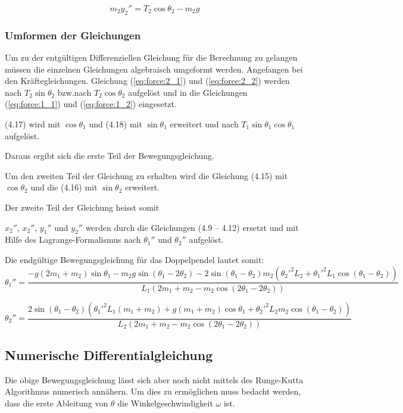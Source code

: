 \documentclass[12pt]{article}
\numberwithin{equation}{subsection}
\begin{document}
\begin{equation} \label{eq:force:2_2}
	m_2 y_2'' = T_2\cos\theta_2 - m_2 g
\end{equation}

\subsubsection{Umformen der Gleichungen}
Um zu der entgültigen Differenziellen Gleichung für die Berechnung zu gelangen müssen die einzelnen Gleichungen algebraisch umgeformt werden.
Angefangen bei den Kräftegleichungen. Gleichung (\ref{eq:force:2_1}) und (\ref{eq:force:2_2}) werden nach $T_2\sin\theta_2$ bzw.nach $T_2\cos\theta_2$ aufgelöst und in die Gleichungen (\ref{eq:force:1_1}) und (\ref{eq:force:1_2}) eingesetzt.



(4.17) wird mit $\cos\theta_1$ und (4.18) mit $\sin\theta_1$ erweitert und nach $T_1\sin\theta_1\cos\theta_1$ aufgelöst.

Daraus ergibt sich die erste Teil der Bewegungsgleichung.


Um den zweiten Teil der Gleichung zu erhalten wird die Gleichung (4.15) mit $\cos\theta_2$ und die (4.16) mit $\sin\theta_2$ erweitert.


Der zweite Teil der Gleichung heisst somit


$x_2''$, $x_2''$, $y_1''$ und $y_2''$ werden durch die Gleichungen (4.9 – 4.12) ersetzt und mit Hilfe des Lagrange-Formalismus nach $\theta_1''$ und $\theta_2''$ aufgelöst. 


Die endgültige Bewegungsgleichung für das Doppelpendel lautet somit:
\begin{equation} \label{eq:final:1}
	\theta_1'' = \frac{-g(2m_1+m_2)\sin\theta_1 - m_2 g \sin(\theta_1 - 2\theta_2) -2\sin(\theta_1 - \theta_2)m_2({\theta_2'}^2 L_2 + {\theta_1'}^2 L_1\cos(\theta_1 - \theta_2))}
	{L_1(2m_1 + m_2 - m_2 \cos(2\theta_1 - 2\theta_2))}
\end{equation}

\begin{equation} \label{eq:final:1}
	\theta_2'' = \frac{2\sin(\theta_1 - \theta_2)({\theta_1'}^2 L_1(m_1 + m_2) + g(m_1 + m_2)\cos\theta_1 + {\theta_2'}^2 L_2 m_2 \cos(\theta_1 - \theta_2))}
	{L_2 (2m_1 + m_2 - m_2 \cos(2 \theta_1 - 2\theta_2))}
\end{equation}

\subsection{Numerische Differentialgleichung}
Die obige Bewegungsgleichung lässt sich aber noch nicht mittels des Runge-Kutta Algorithmus numerisch annähern. Um dies zu ermöglichen muss bedacht werden, dass die erste Ableitung von $\theta$ die Winkelgeschwindigkeit $\omega$ ist.
\end{document}
